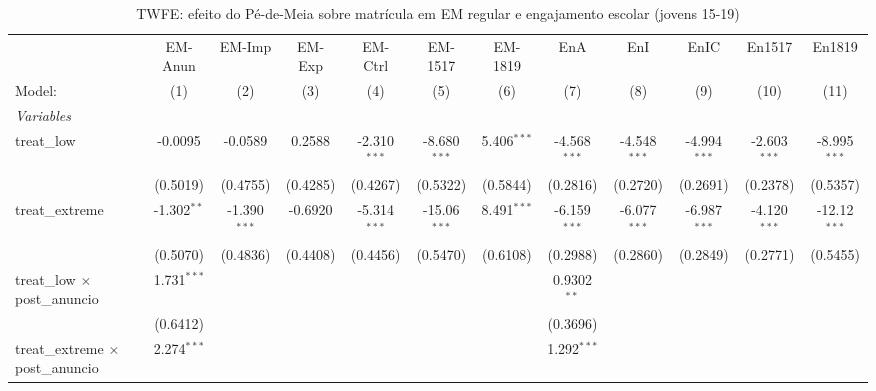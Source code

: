 \begin{table}[htbp]
   \caption{\label{tab:twfe_pdm} TWFE: efeito do Pé-de-Meia sobre matrícula em EM regular e engajamento escolar (jovens 15-19)}
   \centering
   \begin{tabular}{lccccccccccc}
      \tabularnewline \midrule \midrule
                                               & EM-Anun       & EM-Imp         & EM-Exp        & EM-Ctrl        & EM-1517        & EM-1819       & EnA            & EnI            & EnIC           & En1517         & En1819 \\   
      Model:                                   & (1)           & (2)            & (3)           & (4)            & (5)            & (6)           & (7)            & (8)            & (9)            & (10)           & (11)\\  
      \midrule
      \emph{Variables}\\
      treat\_low                               & -0.0095       & -0.0589        & 0.2588        & -2.310$^{***}$ & -8.680$^{***}$ & 5.406$^{***}$ & -4.568$^{***}$ & -4.548$^{***}$ & -4.994$^{***}$ & -2.603$^{***}$ & -8.995$^{***}$\\   
                                               & (0.5019)      & (0.4755)       & (0.4285)      & (0.4267)       & (0.5322)       & (0.5844)      & (0.2816)       & (0.2720)       & (0.2691)       & (0.2378)       & (0.5357)\\   
      treat\_extreme                           & -1.302$^{**}$ & -1.390$^{***}$ & -0.6920       & -5.314$^{***}$ & -15.06$^{***}$ & 8.491$^{***}$ & -6.159$^{***}$ & -6.077$^{***}$ & -6.987$^{***}$ & -4.120$^{***}$ & -12.12$^{***}$\\   
                                               & (0.5070)      & (0.4836)       & (0.4408)      & (0.4456)       & (0.5470)       & (0.6108)      & (0.2988)       & (0.2860)       & (0.2849)       & (0.2771)       & (0.5455)\\   
      treat\_low $\times$ post\_anuncio        & 1.731$^{***}$ &                &               &                &                &               & 0.9302$^{**}$  &                &                &                &   \\   
                                               & (0.6412)      &                &               &                &                &               & (0.3696)       &                &                &                &   \\   
      treat\_extreme $\times$ post\_anuncio    & 2.274$^{***}$ &                &               &                &                &               & 1.292$^{***}$  &                &                &                &   \\   

\end{tabular}
\end{table}

